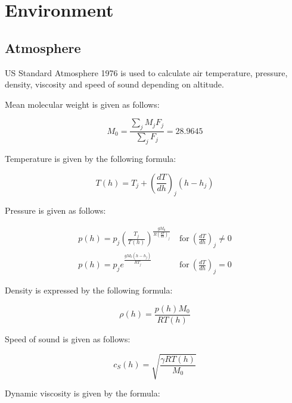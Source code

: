 \chapter{Environment}

\section{Atmosphere}

US Standard Atmosphere 1976 is used to calculate air temperature, pressure, density, viscosity and speed of sound depending on altitude.

Mean molecular weight is given as follows:

\begin{equation}
  M_0 = \frac{ \sum_{j} M_j F_j }{ \sum_{j} F_j } = 28.9645
\end{equation}

Temperature is given by the following formula: \cite{NASA-TM-X-74335}

\begin{equation}
  T \left( h \right)
  =
  T_j + \left( \frac{dT}{dh} \right)_j \left( h - h_j \right)
\end{equation}

Pressure is given as follows: \cite{NASA-TM-X-74335}

\begin{align}
  p \left( h \right)
  =
  p_j \left( \frac{T_j}{ T \left( h \right) } \right)
  ^
  { \frac{gM_0}{ R \left( \frac{dT}{dh} \right)_j } }
  &\mathrm{~for~} \left( \frac{dT}{dh} \right)_j \neq 0 \\
    p \left( h \right)
  =
  p_j e^{ \frac{ g M_0 \left( h - h_j \right) }{RT_j} }
  &\mathrm{~for~} \left( \frac{dT}{dh} \right)_j = 0
\end{align}

Density is expressed by the following formula: \cite{NASA-TM-X-74335}

\begin{equation}
  \rho \left( h \right)
  =
  \frac{ p \left( h \right) M_0 }{ RT \left( h \right) }
\end{equation}

Speed of sound is given as follows: \cite{NASA-TM-X-74335}

\begin{equation}
  c_S \left( h \right)
  =
  \sqrt{ \frac{ \gamma RT \left( h \right) }{ M_0 } }
\end{equation}

Dynamic viscosity is given by the formula: \cite{NASA-TM-X-74335}

